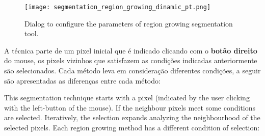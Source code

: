 \begin{figure}[!htb]
    \centering
    \texttt{[image: segmentation\_region\_growing\_dinamic\_pt.png]}
    \caption{Dialog to configure the parameters of region growing segmentation tool.}
    \label{fig:segmentation_region_growing_dinamic}
\end{figure}

A técnica parte de um pixel inicial que é indicado clicando com o \textbf{botão direito} do mouse, os pixels vizinhos que satisfazem as condições indicadas anteriormente são selecionados. Cada método leva em consideração diferentes condições, a seguir são apresentadas as diferenças entre cada método:

This segmentation technique starts with a pixel (indicated by the user clicking with the left-button of the mouse). If the neighbour pixels meet some conditions are selected. Iteratively, the selection expands analyzing the neighbourhood of the selected pixels. Each region growing method has a different condition of selection:

